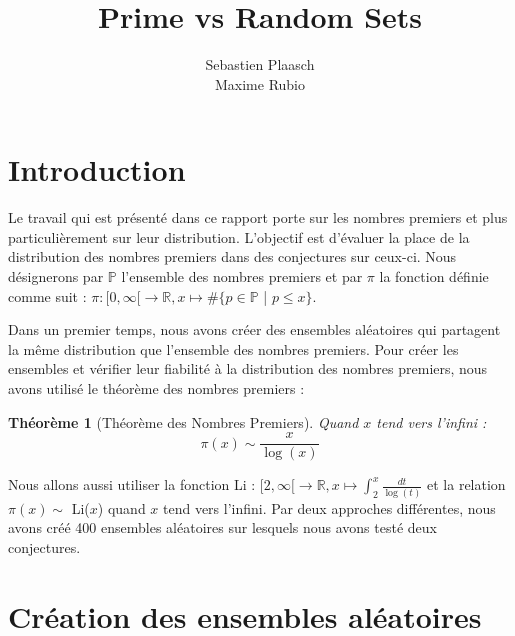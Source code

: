 \documentclass{article}
\begin{document}
\author{Sebastien Plaasch \\ Maxime Rubio}
\title{Prime vs Random Sets}
\maketitle
\newpage 
\newpage
\tableofcontents


\newpage

\section{Introduction}
    \label{sec:intro}
\theoremstyle{plain}
\newtheorem{Thm}{Théorème}

Le travail qui est présenté dans ce rapport porte sur les nombres premiers et plus particulièrement sur leur distribution. L'objectif est d'évaluer la place de la distribution des nombres premiers dans des conjectures sur ceux-ci. Nous désignerons par $\mathbb{P}$ l'ensemble des nombres premiers et par $\pi$ la fonction définie comme suit : $\pi : [0, \infty [ \rightarrow \mathbb{R}, x \mapsto \# \{p \in \mathbb{P}$ | $p \leqslant x\}$. 

Dans un premier temps, nous avons créer des ensembles aléatoires qui partagent la même distribution que l'ensemble des nombres premiers. Pour créer les ensembles et vérifier leur fiabilité à la distribution des nombres premiers, nous avons utilisé le théorème des nombres premiers : 
\begin{Thm}[Théorème des Nombres Premiers]
\label{TNP}
	Quand $x$ tend vers l'infini : 
	\[ \pi(x) \sim \frac{x}{\log(x)}  \] 
\end{Thm}
Nous allons aussi utiliser la fonction Li : $ [2, \infty [ \rightarrow \mathbb{R}, x \mapsto \int_{2}^{x} \frac{dt}{\log(t)} $ et la relation $\pi(x) \sim$ Li($x$) quand $x$ tend vers l'infini.  Par deux approches différentes, nous avons créé 400 ensembles aléatoires sur lesquels nous avons testé deux conjectures. 
\clearpage

\section{Création des ensembles aléatoires}
    \label{sec:sec1}
    
    
    
		
\end{document}

